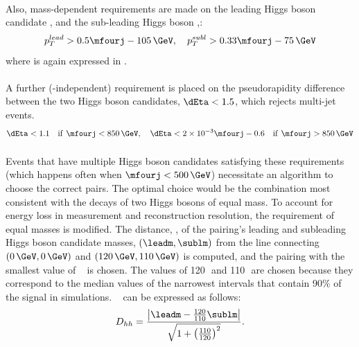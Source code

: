 \paragraph{}
Also, mass-dependent requirements are made on the leading Higgs boson candidate \pt, and the sub-leading Higgs boson \pt,:
\begin{equation}
p_T^{lead} > 0.5\mfourj - 105\,\GeV, \quad
p_T^{subl} > 0.33\mfourj - 75\,\GeV
\end{equation}
where \mfourj is again expressed in \GeV.

\paragraph{}
A further (\mfourj-independent) requirement is placed on the pseudorapidity difference between the two Higgs boson candidates, $\dEta < 1.5$, which rejects multi-jet events.
\begin{equation}
\dEta < 1.1 \quad \mathrm{if}\ \mfourj < 850\,\GeV , \quad
\dEta < 2\times10^{-3} \mfourj - 0.6 \quad \mathrm{if}\ \mfourj > 850\,\GeV
\end{equation}

\paragraph{}
Events that have multiple Higgs boson candidates satisfying these requirements (which happens often when $\mfourj < 500\,\GeV$) necessitate an algorithm to choose the correct pairs. 
The optimal choice would be the combination most consistent with the decays of two Higgs bosons of equal mass.
To account for energy loss in measurement and reconstruction resolution, the requirement of equal masses is modified. 
The distance, \Dhh, of the pairing's leading and subleading Higgs boson candidate masses, $\left(\leadm, \sublm\right)$ from the line connecting $\left(0\,\GeV, 0\,\GeV\right)$ and $\left(120\,\GeV, 110\,\GeV\right)$ is computed, and the pairing with the smallest value of \Dhh~ is chosen.
The values of 120\,\GeV\, and 110\,\GeV\, are chosen because they correspond to the median values of the narrowest intervals that contain 90\% of the signal in simulations.%
\Dhh~ can be expressed as follows:
\begin{equation}
D_{hh} = \frac{\left|\leadm - \frac{120}{110}\sublm\right|}{\sqrt{1+\left(\frac{110}{120}\right)^{2}}}.
\end{equation}

